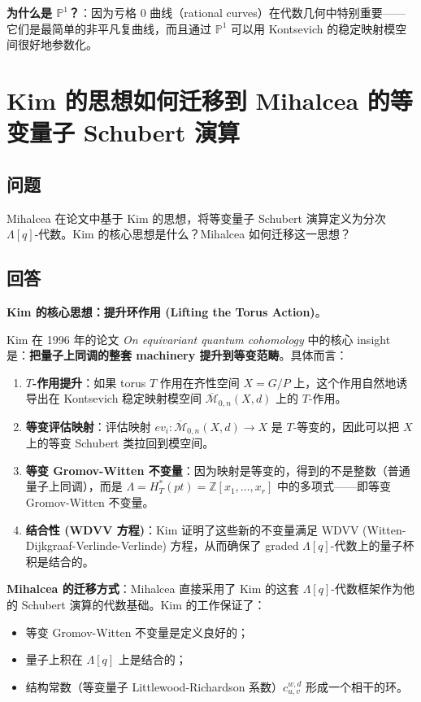 \textbf{为什么是 $\mathbb{P}^1$？}：因为亏格 0 曲线（rational curves）在代数几何中特别重要——它们是最简单的非平凡复曲线，而且通过 $\mathbb{P}^1$ 可以用 Kontsevich 的稳定映射模空间很好地参数化。
\section{Kim 的思想如何迁移到 Mihalcea 的等变量子 Schubert 演算}\label{sec:kim-to-mihalcea}
\subsection{问题}
Mihalcea 在论文中基于 Kim 的思想，将等变量子 Schubert 演算定义为分次 $\Lambda[q]$-代数。Kim 的核心思想是什么？Mihalcea 如何迁移这一思想？
\subsection{回答}
\textbf{Kim 的核心思想：提升环作用 (Lifting the Torus Action)}。

Kim 在 1996 年的论文 \textit{On equivariant quantum cohomology} 中的核心 insight 是：\textbf{把量子上同调的整套 machinery 提升到等变范畴}。具体而言：

\begin{enumerate}
\item \textbf{$T$-作用提升}：如果 torus $T$ 作用在齐性空间 $X = G/P$ 上，这个作用自然地诱导出在 Kontsevich 稳定映射模空间 $\overline{\mathcal{M}}_{0,n}(X,d)$ 上的 $T$-作用。

\item \textbf{等变评估映射}：评估映射 $ev_i: \overline{\mathcal{M}}_{0,n}(X,d) \to X$ 是 $T$-等变的，因此可以把 $X$ 上的等变 Schubert 类拉回到模空间。

\item \textbf{等变 Gromov-Witten 不变量}：因为映射是等变的，得到的不是整数（普通量子上同调），而是 $\Lambda = H_T^*(pt) = \mathbb{Z}[x_1,\ldots,x_r]$ 中的多项式——即等变 Gromov-Witten 不变量。

\item \textbf{结合性 (WDVV 方程)}：Kim 证明了这些新的不变量满足 WDVV (Witten-Dijkgraaf-Verlinde-Verlinde) 方程，从而确保了 graded $\Lambda[q]$-代数上的量子杯积是结合的。
\end{enumerate}

\textbf{Mihalcea 的迁移方式}：Mihalcea 直接采用了 Kim 的这套 $\Lambda[q]$-代数框架作为他的 Schubert 演算的代数基础。Kim 的工作保证了：
\begin{itemize}
\item 等变 Gromov-Witten 不变量是定义良好的；
\item 量子上积在 $\Lambda[q]$ 上是结合的；
\item 结构常数（等变量子 Littlewood-Richardson 系数）$c_{u,v}^{w,d}$ 形成一个相干的环。
\end{itemize}

